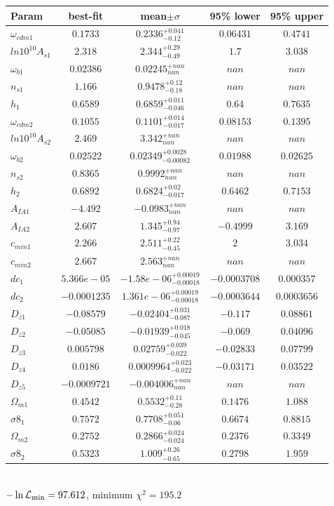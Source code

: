 \begin{tabular}{|l|c|c|c|c|} 
 \hline 
Param & best-fit & mean$\pm\sigma$ & 95\% lower & 95\% upper \\ \hline 
$\omega_{cdm 1 }$ &$0.1733$ & $0.2336_{-0.12}^{+0.041}$ & $0.06431$ & $0.4741$ \\ 
$ln10^{10}A_{s 1 }$ &$2.318$ & $2.344_{-0.49}^{+0.29}$ & $1.7$ & $3.038$ \\ 
$\omega_{b 1 }$ &$0.02386$ & $0.02245_{nan}^{+nan}$ & $nan$ & $nan$ \\ 
$n_{s 1 }$ &$1.166$ & $0.9478_{-0.18}^{+0.12}$ & $nan$ & $nan$ \\ 
$h_{1 }$ &$0.6589$ & $0.6859_{-0.046}^{+0.011}$ & $0.64$ & $0.7635$ \\ 
$\omega_{cdm 2 }$ &$0.1055$ & $0.1101_{-0.017}^{+0.014}$ & $0.08153$ & $0.1395$ \\ 
$ln10^{10}A_{s 2 }$ &$2.469$ & $3.342_{nan}^{+nan}$ & $nan$ & $nan$ \\ 
$\omega_{b 2 }$ &$0.02522$ & $0.02349_{-0.00082}^{+0.0028}$ & $0.01988$ & $0.02625$ \\ 
$n_{s 2 }$ &$0.8365$ & $0.9992_{nan}^{+nan}$ & $nan$ & $nan$ \\ 
$h_{2 }$ &$0.6892$ & $0.6824_{-0.017}^{+0.02}$ & $0.6462$ & $0.7153$ \\ 
$A_{IA 1 }$ &$-4.492$ & $-0.0983_{nan}^{+nan}$ & $nan$ & $nan$ \\ 
$A_{IA 2 }$ &$2.607$ & $1.345_{-0.97}^{+0.94}$ & $-0.4999$ & $3.169$ \\ 
$c_{min 1 }$ &$2.266$ & $2.511_{-0.45}^{+0.22}$ & $2$ & $3.034$ \\ 
$c_{min 2 }$ &$2.667$ & $2.563_{nan}^{+nan}$ & $nan$ & $nan$ \\ 
$dc_{1 }$ &$5.366e-05$ & $-1.58e-06_{-0.00018}^{+0.00019}$ & $-0.0003708$ & $0.000357$ \\ 
$dc_{2 }$ &$-0.0001235$ & $1.361e-06_{-0.00018}^{+0.00019}$ & $-0.0003644$ & $0.0003656$ \\ 
$D_{z1 }$ &$-0.08579$ & $-0.02404_{-0.087}^{+0.031}$ & $-0.117$ & $0.08861$ \\ 
$D_{z2 }$ &$-0.05085$ & $-0.01939_{-0.045}^{+0.018}$ & $-0.069$ & $0.04096$ \\ 
$D_{z3 }$ &$0.005798$ & $0.02759_{-0.022}^{+0.039}$ & $-0.02833$ & $0.07799$ \\ 
$D_{z4 }$ &$0.0186$ & $0.0009964_{-0.022}^{+0.023}$ & $-0.03171$ & $0.03522$ \\ 
$D_{z5 }$ &$-0.0009721$ & $-0.004006_{nan}^{+nan}$ & $nan$ & $nan$ \\ 
$\Omega_{m 1 }$ &$0.4542$ & $0.5532_{-0.28}^{+0.11}$ & $0.1476$ & $1.088$ \\ 
$\sigma8_{1 }$ &$0.7572$ & $0.7708_{-0.06}^{+0.051}$ & $0.6674$ & $0.8815$ \\ 
$\Omega_{m 2 }$ &$0.2752$ & $0.2866_{-0.024}^{+0.024}$ & $0.2376$ & $0.3349$ \\ 
$\sigma8_{2 }$ &$0.5323$ & $1.009_{-0.65}^{+0.26}$ & $0.2798$ & $1.959$ \\ 
\hline 
 \end{tabular} \\ 
$-\ln{\cal L}_\mathrm{min} =97.612$, minimum $\chi^2=195.2$ \\ 
